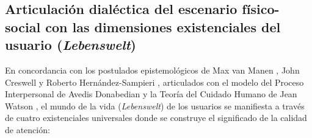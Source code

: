 \subsection{Articulación dialéctica del escenario físico-social con las dimensiones existenciales del usuario (\textit{Lebenswelt})}
\label{sec:2.6_articulacion_existenciales}

En concordancia con los postulados epistemológicos de Max van Manen \cite{vanmanen1990}, John Creswell \cite{creswell2013} y Roberto Hernández-Sampieri \cite{sampieri2018}, articulados con el modelo del Proceso Interpersonal de Avedis Donabedian \cite{donabedian2005} y la Teoría del Cuidado Humano de Jean Watson \cite{watson2008}, el mundo de la vida (\textit{Lebenswelt}) de los usuarios se manifiesta a través de cuatro existenciales universales donde se construye el significado de la calidad de atención:


